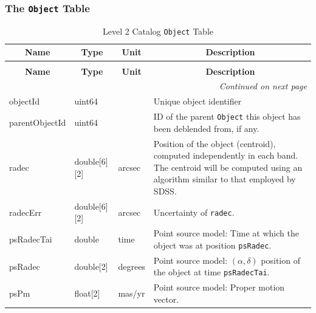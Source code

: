 \documentclass[12pt]{article}
\newcommand{\code}[1]{\texttt{#1}}
\newcommand{\Object}{\code{Object}\xspace}
\newcommand{\req}[1]{\marginpar{\tiny #1}}
\newcommand{\dmreq}[1]{\req{DMS-REQ-#1}}
\begin{document}
\subsubsection{The \Object Table}
\label{sec:objectTable}
\dmreq{0275}

\begin{center}
\begin{longtable}{p{3cm}p{2cm}p{2cm}p{5cm}}
\caption[\Object Table]{Level 2 Catalog \Object Table\label{tbl:objectTable}
} \\

\hline \multicolumn{1}{c}{\bf Name} & \multicolumn{1}{c}{\bf Type} & \multicolumn{1}{c}{\bf Unit} & \multicolumn{1}{c}{\bf Description} \\ \hline
\endfirsthead

\caption[\Object Table]{Level 2 Catalog \Object Table}\\

\hline \multicolumn{1}{c}{\bf Name} & \multicolumn{1}{c}{\bf Type} & \multicolumn{1}{c}{\bf Unit} & \multicolumn{1}{c}{\bf Description} \\ \hline
 \endhead
\endhead

\hline \multicolumn{4}{r}{{\em Continued on next page}} \\
\endfoot

\hline\hline
\endlastfoot

objectId & uint64 & ~ & Unique object identifier \\

parentObjectId & uint64 & ~ & ID of the parent \Object this object has been deblended from, if any. \\

radec & double[6][2] & arcsec & Position of the object (centroid), computed independently in each band.
The centroid will be computed using an algorithm similar to that employed by SDSS.\\

radecErr & double[6][2] & arcsec & Uncertainty of {\tt radec}. \\

psRadecTai & double & time & Point source model: Time at which the object was at position {\tt psRadec}. \\

psRadec & double[2] & degrees & Point source model: $(\alpha, \delta)$ position of the object at time {\tt psRadecTai}. \\

psPm & float[2] & mas/yr & Point source model: Proper motion vector.\\


\end{longtable}
\end{center}
\end{document}
